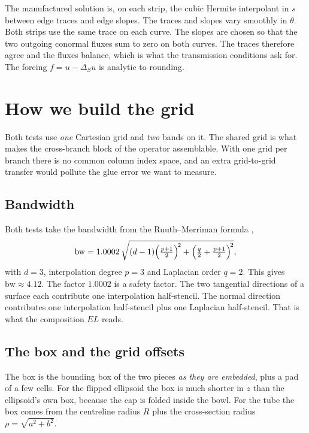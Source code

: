 The manufactured solution is, on each strip, the cubic Hermite
interpolant in $s$ between edge traces and edge slopes. The traces and
slopes vary smoothly in $\theta$. Both strips use the same trace on each
curve. The slopes are chosen so that the two outgoing conormal fluxes sum
to zero on both curves. The traces therefore agree and the fluxes
balance, which is what the transmission conditions ask for. The forcing
$f=u-\Delta_S u$ is analytic to rounding.

\section{How we build the grid}

Both tests use \emph{one} Cartesian grid and \emph{two} bands on it. The
shared grid is what makes the cross-branch block of the operator
assemblable. With one grid per branch there is no common column index
space, and an extra grid-to-grid transfer would pollute the glue error we
want to measure.

\subsection{Bandwidth}

Both tests take the bandwidth from the Ruuth--Merriman formula
\cite{RuuthMerriman2008},
\begin{equation}
  \mathrm{bw} = 1.0002\,
  \sqrt{(d-1)\Bigl(\tfrac{p+1}{2}\Bigr)^{\!2}
        + \Bigl(\tfrac{q}{2}+\tfrac{p+1}{2}\Bigr)^{\!2}} ,
  \label{eq:bw}
\end{equation}
with $d=3$, interpolation degree $p=3$ and Laplacian order $q=2$. This
gives $\mathrm{bw}\approx 4.12$. The factor $1.0002$ is a safety factor.
The two tangential directions of a surface each contribute one
interpolation half-stencil. The normal direction contributes one
interpolation half-stencil plus one Laplacian half-stencil. That is what
the composition $EL$ reads.

\subsection{The box and the grid offsets}

The box is the bounding box of the two pieces \emph{as they are
embedded}, plus a pad of a few cells. For the flipped ellipsoid the box
is much shorter in $z$ than the ellipsoid's own box, because the cap is
folded inside the bowl. For the tube the box comes from the centreline
radius $R$ plus the cross-section radius $\rho=\sqrt{a^2+b^2}$.

